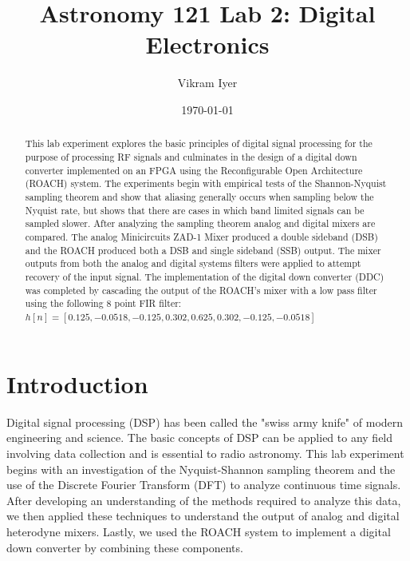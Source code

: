 \documentclass{article}
\title{Astronomy 121 Lab 2: Digital Electronics}
\author{Vikram Iyer}
\date{\today}
\begin{document}
\maketitle


\begin{abstract}
This lab experiment explores the basic principles of digital signal processing for the purpose of processing RF signals and culminates in the design of a digital down converter implemented on an FPGA using the Reconfigurable Open Architecture (ROACH) system. The experiments begin with empirical tests of the Shannon-Nyquist sampling theorem and show that aliasing generally occurs when sampling below the Nyquist rate, but shows that there are cases in which band limited signals can be sampled slower. After analyzing the sampling theorem analog and digital mixers are compared. The analog Minicircuits ZAD-1 Mixer produced a double sideband (DSB) and the ROACH produced both a DSB and single sideband (SSB) output. The mixer outputs from both the analog and digital systems filters were applied to attempt recovery of the input signal. The implementation of the digital down converter (DDC) was completed by cascading the output of the ROACH's mixer with a low pass filter using the following 8 point FIR filter: $h[n] = [0.125, -0.0518, -0.125, 0.302, 0.625, 0.302, -0.125, -0.0518]$
\end{abstract}


\section{Introduction}
  Digital signal processing (DSP) has been called the "swiss army knife" \citep{miki_ee123_intro} of modern engineering and science. The basic concepts of DSP can be applied to any field involving data collection and is essential to radio astronomy.  This lab experiment begins with an investigation of the Nyquist-Shannon sampling theorem and the use of the Discrete Fourier Transform (DFT) to analyze continuous time signals.  After developing an understanding of the methods required to analyze this data, we then applied these techniques to understand the output of analog and digital heterodyne mixers.  Lastly, we used the ROACH system to implement a digital down converter by combining these components.
\end{document}
